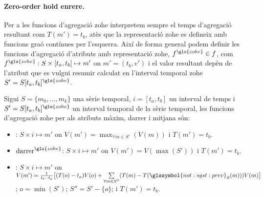 \paragraph{Zero-order hold enrere.}
Per a les funcions d'agregació \gls{zohe} interpretem sempre el temps
d'agregació resultant com $T(m')=t_b$, atès que la representació
\gls{zohe} es defineix amb funcions graó contínues per
l'esquerra. Així de forma general podem definir les funcions
d'agregació d'atributs amb representació \gls{zohe},
$f^{\gls{zohe}}\in f$, com $f^{\gls{zohe}}: S \times [t_a,t_b] \mapsto
m'$ on $m'=(t_b,v')$ i el valor resultant depèn de l'atribut que es
vulgui resumir calculat en l'interval temporal \gls{zohe}
$S'=S[t_a,t_b]^{\gls{zohe}}$.
\begin{definition}
  Sigui $S=\{m_0,\dotsc,m_k\}$ una sèrie temporal, $i=[t_a,t_b]$ un
  interval de temps i $S'=S[t_a,t_b]^{\gls{zohe}}$ un interval
  temporal de la sèrie temporal, les funcions d'agregació \gls{zohe}
  per als atributs màxim, darrer i mitjana són:
  \begin{itemize}
  \item {}: $S \times i \mapsto m'$ on
    $V(m') = \max_{\forall m \in S'}(V(m))$ i $T(m')=t_b$.

  \item $\operatorname{darrer}^{\gls{zohe}}$: $S \times i \mapsto m'$
    on $V(m') = V(\max(S'))$ i $T(m')=t_b$.

  \item {}: $S \times i \mapsto m'$ on
    $V(m') = \frac{1}{t_b-t_a} \big[ (T(o)-t_a)V(o) +
    \sum\limits_{\forall m \in S''}( T(m)-
    T(\glssymbol{not:sgst:prev}_S (m)) )V(m) \big]$; $o=\min(S')$;
    $S''= S' - \{o\}$; i $T(m')=t_b$.
  \end{itemize}
\end{definition}




